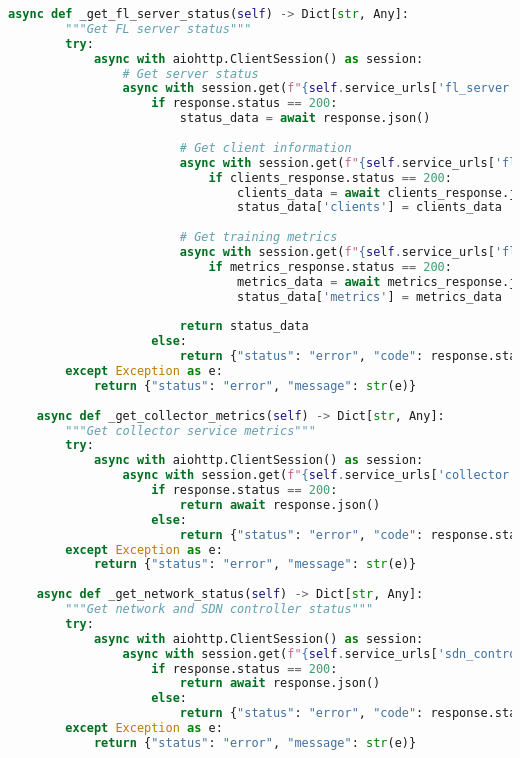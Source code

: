 \begin{lstlisting}[language=python, caption=Dashboard Backend Extension]
    async def _get_fl_server_status(self) -> Dict[str, Any]:
        """Get FL server status"""
        try:
            async with aiohttp.ClientSession() as session:
                # Get server status
                async with session.get(f"{self.service_urls['fl_server']}/status") as response:
                    if response.status == 200:
                        status_data = await response.json()
                        
                        # Get client information
                        async with session.get(f"{self.service_urls['fl_server']}/clients") as clients_response:
                            if clients_response.status == 200:
                                clients_data = await clients_response.json()
                                status_data['clients'] = clients_data
                        
                        # Get training metrics
                        async with session.get(f"{self.service_urls['fl_server']}/metrics") as metrics_response:
                            if metrics_response.status == 200:
                                metrics_data = await metrics_response.json()
                                status_data['metrics'] = metrics_data
                        
                        return status_data
                    else:
                        return {"status": "error", "code": response.status}
        except Exception as e:
            return {"status": "error", "message": str(e)}
    
    async def _get_collector_metrics(self) -> Dict[str, Any]:
        """Get collector service metrics"""
        try:
            async with aiohttp.ClientSession() as session:
                async with session.get(f"{self.service_urls['collector']}/metrics/summary") as response:
                    if response.status == 200:
                        return await response.json()
                    else:
                        return {"status": "error", "code": response.status}
        except Exception as e:
            return {"status": "error", "message": str(e)}
    
    async def _get_network_status(self) -> Dict[str, Any]:
        """Get network and SDN controller status"""
        try:
            async with aiohttp.ClientSession() as session:
                async with session.get(f"{self.service_urls['sdn_controller']}/fl/stats") as response:
                    if response.status == 200:
                        return await response.json()
                    else:
                        return {"status": "error", "code": response.status}
        except Exception as e:
            return {"status": "error", "message": str(e)}
    

\end{lstlisting}
